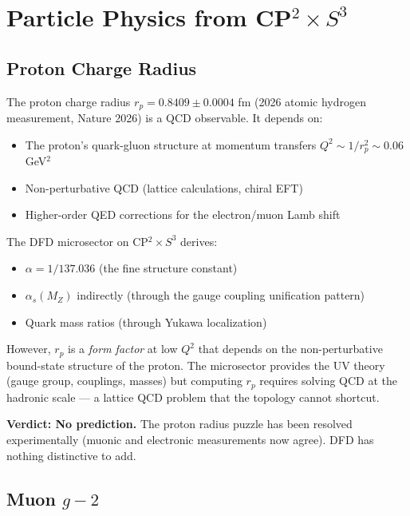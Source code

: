 \documentclass[11pt]{article}
\begin{document}
\section{Particle Physics from CP$^2 \times S^3$}
\label{sec:particle}

\subsection{Proton Charge Radius}

The proton charge radius $r_p = 0.8409 \pm 0.0004$ fm (2026
atomic hydrogen measurement, Nature 2026) is a QCD observable.
It depends on:
\begin{itemize}
\item The proton's quark-gluon structure at momentum transfers
  $Q^2 \sim 1/r_p^2 \sim 0.06$ GeV$^2$
\item Non-perturbative QCD (lattice calculations, chiral EFT)
\item Higher-order QED corrections for the electron/muon
  Lamb shift
\end{itemize}

The DFD microsector on CP$^2 \times S^3$ derives:
\begin{itemize}
\item $\alpha = 1/137.036$ (the fine structure constant)
\item $\alpha_s(M_Z)$ indirectly (through the gauge coupling
  unification pattern)
\item Quark mass ratios (through Yukawa localization)
\end{itemize}

However, $r_p$ is a \emph{form factor} at low $Q^2$ that depends
on the non-perturbative bound-state structure of the proton.
The microsector provides the UV theory (gauge group, couplings,
masses) but computing $r_p$ requires solving QCD at the
hadronic scale --- a lattice QCD problem that the topology
cannot shortcut.

\textbf{Verdict: No prediction.}  The proton radius puzzle has
been resolved experimentally (muonic and electronic measurements
now agree).  DFD has nothing distinctive to add.

\subsection{Muon $g-2$}
\end{document}

